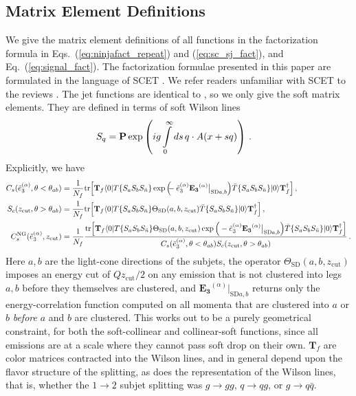 \documentclass[a4paper,11pt]{article}
\newcommand{\nbar}{{\bar n}}
\newcommand{\ecflp}[2]{\tilde e_{#1}^{(#2)}}
\newcommand{\ecfop}[2]{\mathbf{E_{#1}}^{(#2)}}
\def\zcut{z_{\text{cut}}}
\def\nbar{\bar n}
\DeclareRobustCommand{\Eq}[1]{Eq.~(\ref{#1})}
\DeclareRobustCommand{\Eqs}[2]{Eqs.~(\ref{#1}) and (\ref{#2})}
\begin{document}
\subsection{Matrix Element Definitions}
We give the matrix element definitions of all functions in the factorization formula in \Eqs{eq:ninjafact_repeat}{eq:sc_sj_fact}, and \Eq{eq:signal_fact}. The factorization formulae presented in this paper are formulated in the language of SCET \cite{Bauer:2000yr,Bauer:2001ct,Bauer:2001yt,Bauer:2002nz}. We refer readers unfamiliar with SCET to the reviews \cite{iain_notes,Becher:2014oda}. The jet functions are identical to \cite{Larkoski:2015kga}, so we only give the soft matrix elements. They are defined in terms of soft Wilson lines 
\begin{align}\label{eq:soft_wilson_line}
S_q&={\bf P} \exp \left( ig \int\limits_0^\infty ds\, q\cdot A(x+sq)    \right)\,.
\end{align}
Explicitly, we have
\begin{align}
C_s(\ecflp{3}{\alpha},\theta<\theta_{ab})&=\frac{1}{N_{f}}\text{tr}\Big[\mathbf{T}_{f}\langle 0|T\{S_{a}S_{b}S_{\nbar}\}\exp\Big(\hspace{-0.2cm}-\ecflp{3}{\alpha}\ecfop{3}{\alpha}\big|_{\text{SD} a,b}\Big)\bar T\{S_{a}S_{b}S_{\nbar}\}|0\rangle\mathbf{T}^{\dagger}_{f}\Big]\,, \\
S_c(\zcut,\theta>\theta_{ab})&=\frac{1}{N_{f}}\text{tr}\Big[\mathbf{T}_{f}\langle 0|T\{S_{a}S_{b}S_{\nbar}\}\Theta_{\text{SD}}(a,b,\zcut)\bar T\{S_{a}S_{b}S_{\nbar}\}|0\rangle\mathbf{T}^{\dagger}_{f}\Big]\,,\\
C^{\text{NG}}_s(\ecflp{3}{\alpha},\zcut)&=  \frac{1}{N_{f}}\frac{\text{tr}\Big[\mathbf{T}_{f}\langle 0|T\{S_{a}S_{b}S_{\nbar}\}\Theta_{\text{SD}}(a,b,\zcut)\exp\Big(-\ecflp{3}{\alpha}\ecfop{3}{\alpha}\big|_{\text{SD} a,b}\Big)\bar T\{S_{a}S_{b}S_{\nbar}\}|0\rangle\mathbf{T}^{\dagger}_{f}\Big]}{C_s(\ecflp{3}{\alpha},\theta<\theta_{ab})S_c(\zcut,\theta>\theta_{ab})}\,.
\end{align}
Here $a,b$ are the light-cone directions of the subjets, the operator $\Theta_{\text{SD}}(a,b,\zcut)$ imposes an energy cut of $Q\zcut/2$ on any emission that is not clustered into legs $a,b$ before they themselves are clustered, and $\ecfop{3}{\alpha}\big|_{\text{SD} a,b}$ returns only the energy-correlation function computed on all momenta that are clustered into $a$ or $b$ \emph{before} $a$ and $b$ are clustered. This works out to be a purely geometrical constraint, for both the soft-collinear and collinear-soft functions, since all emissions are at a scale where they cannot pass soft drop on their own.  $\mathbf{T}_f$ are color matrices contracted into the Wilson lines, and in general depend upon the flavor structure of the splitting, as does the representation of the Wilson lines, that is, whether the $1\to2$ subjet splitting was $g\rightarrow gg$, $q\rightarrow qg$, or $g\rightarrow q\bar{q}$.
\end{document}
